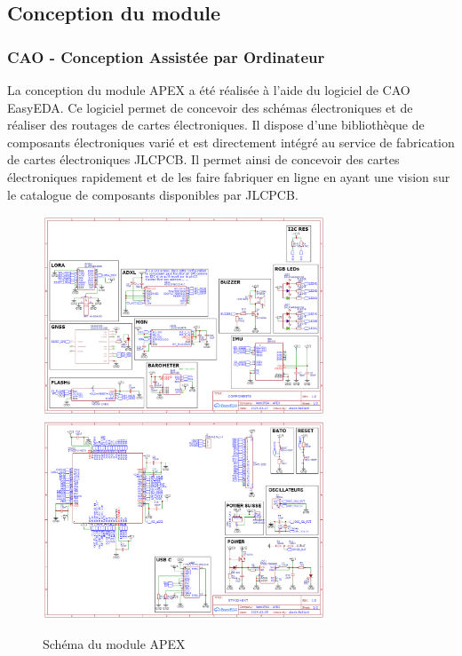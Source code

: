 \documentclass{article}
\begin{document}
\newpage
\subsection{Conception du module}

\subsubsection{CAO - Conception Assistée par Ordinateur}

La conception du module APEX a été réalisée à l'aide du logiciel de CAO EasyEDA. Ce logiciel
permet de concevoir des schémas électroniques et de réaliser des routages de cartes
électroniques. Il dispose d'une bibliothèque de composants électroniques varié et est directement
intégré au service de fabrication de cartes électroniques JLCPCB. Il permet ainsi de concevoir
des cartes électroniques rapidement et de les faire fabriquer en ligne en ayant une vision
sur le catalogue de composants disponibles par JLCPCB.

\begin{figure}[h]
    \centering

    \includegraphics[width=0.75\textwidth]{image/Sheet_1.png}
    \includegraphics[width=0.75\textwidth]{image/Sheet_2.png}

    \caption{Schéma du module APEX}
    \label{fig:apex_schematic}
\end{figure}
\end{document}

